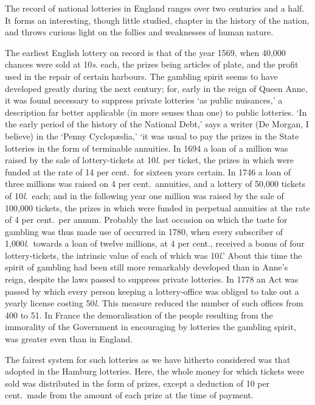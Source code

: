 \documentclass[letterpaper,12pt,oneside,openany]{memoir}
\begin{document}
The record of national lotteries in England ranges
over two centuries and a half. It forms an interesting,
though little studied, chapter in the history of the
nation, and throws curious light on the follies and
weaknesses of human nature.

The earliest English lottery on record is that of the
year 1569, when 40,000 chances were sold at 10\textit{s}. each,
the prizes being articles of plate, and the profit used in
the repair of certain harbours. The gambling spirit
seems to have developed greatly during the next century;
for, early in the reign of Queen Anne, it was found necessary
to suppress private lotteries `as public nuisances,'
a description far better applicable (in more senses than
one) to public lotteries. `In the early period of the
history of the National Debt,' says a writer (De Morgan,
I believe) in the `Penny Cyclop{\ae}dia,' `it was usual to
pay the prizes in the State lotteries in the form of
terminable annuities. In 1694 a loan of a million was
raised by the sale of lottery-tickets at 10\textit{l}. per ticket,
the prizes in which were funded at the rate of 14 per
cent.\ for sixteen years certain. In 1746 a loan of three
millions was raised on 4 per cent.\ annuities, and a
lottery of 50,000 tickets of 10\textit{l}.\ each; and in the following
year one million was raised by the sale of 100,000
tickets, the prizes in which were funded in perpetual
annuities at the rate of 4 per cent.\ per annum. Probably
the last occasion on which the taste for gambling was
thus made use of occurred in 1780, when every subscriber
of 1,000\textit{l}.\ towards a loan of twelve millions, at 4
per cent., received a bonus of four lottery-tickets, the
intrinsic value of each of which was 10\textit{l}.' About this time
the spirit of gambling had been still more remarkably
developed than in Anne's reign, despite the laws passed
to suppress private lotteries. In 1778 an Act was
passed by which every person keeping a lottery-office
was obliged to take out a yearly license costing 50\textit{l}.
This measure reduced the number of such offices from
400 to 51. In France the demoralisation of the people
resulting from the immorality of the Government in
encouraging by lotteries the gambling spirit, was greater
even than in England.

The fairest system for such lotteries as we have
hitherto considered was that adopted in the Hamburg
lotteries. Here, the whole money for which tickets were
sold was distributed in the form of prizes, except a deduction
of 10 per cent.\ made from the amount of each
prize at the time of payment.
\end{document}
